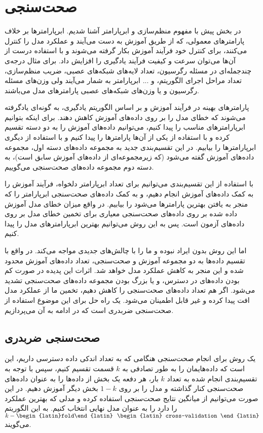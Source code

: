 \section{صحت‌سنجی}

در بخش پیش با مفهوم منظم‌سازی و ابرپارامتر آشنا شدیم. ابرپارامتر‌ها بر خلاف پارامترهای معمولی، که از طریق آموزش به دست می‌آیند و عملکرد مدل را کنترل می‌کنند، برای کنترل خود فرآیند آموزش بکار گرفته می‌شوند و با استفاده درست از آن‌ها می‌توان سرعت و کیفیت فرآیند یادگیری را افزایش داد. 
برای مثال درجه‌ی چندجمله‌ای در مسئله‌ رگرسیون، تعداد لایه‌های شبکه‌های عصبی، ضریب منظم‌سازی، تعداد مراحل اجرای الگوریتم، و ... ابرپارامتر به شمار می‌آیند ولی وزن‌های مسئله رگرسیون و یا وزن‌های شبکه‌های عصبی پارامتر‌های مدل می‌باشند.

پارامتر‌های بهینه در فرآیند آموزش و بر اساس الگوریتم یادگیری، به گونه‌ای یادگرفته می‌شوند که خطای مدل را بر روی داده‌های آموزش کاهش دهند. برای اینکه بتوانیم ابرپارامتر‌های مناسب را پیدا کنیم، می‌توانیم داده‌های آموزش را به دو دسته تقسیم کرده و با استفاده از یکی از آن‌ها پارامتر‌ها را پیدا کنیم و با استفاده از دیگری ابرپارامتر‌ها را بیابیم. در این تقسیم‌بندی جدید به مجموعه‌ داده‌های دسته اول، مجموعه‌ داده‌های آموزش گفته می‌شود (که زیرمجموعه‌ای از داده‌های آموزش سابق است)، به دسته دوم مجموعه داده‌های صحت‌سنجی می‌گوییم.

با استفاده از این تقسیم‌بندی می‌توانیم برای تعداد ابرپارامتر دلخواه، فرآیند آموزش را به کمک داده‌های آموزش انجام دهیم، و به کمک داده‌های صحت‌سنجی ابرپارامتر را که منجر به یافتن بهترین پارامتر‌ها می‌شود را بیابیم. در واقع میزان خطای مدل آموزش داده شده بر روی داده‌های صحت‌سنجی معیاری برای تخمین خطای مدل بر روی داده‌های آزمون است. پس به این روش می‌توانیم بهترین ابرپارامترهای مدل را پیدا کنیم.

اما این روش بدون ایراد نبوده و ما را با چالش‌های جدیدی مواجه می‌کند. در واقع با تقسیم داده‌ها به دو مجموعه آموزش و صحت‌سنجی، تعداد داده‌های آموزش محدود شده و این منجر به کاهش عملکرد مدل خواهد شد. اثرات این پدیده در صورت کم بودن داده‌های در دسترس، و یا بزرگ بودن مجموعه‌ داده‌های صحت‌سنجی تشدید می‌شود. اگر هم تعداد داده‌های صحت‌سنجی را کاهش دهیم، تخمین ما از عملکرد مدل افت پیدا کرده و غیر قابل اطمینان می‌شود. یک راه حل برای این موضوع استفاده از صحت‌سنجی ضربدری است که در ادامه به آن می‌پردازیم.

\subsection{صحت‌سنجی ضربدری}

یک روش برای انجام صحت‌سنجی هنگامی که به تعداد اندکی داده دسترسی داریم، این است که داده‌هایمان را به طور تصادفی به  $k$ قسمت تقسیم کنیم، سپس با توجه به تقسیم‌بندی انجام شده به تعداد $k$ بار، هر دفعه یک بخش از داده‌ها را به عنوان داده‌های صحت‌سنجی کنار گذاشته و مدل را بر روی $1-k$ بخش دیگر آموزش دهیم. در این صورت می‌توانیم از میانگین نتایج صحت‌سنجی استفاده کرده و مدلی که بهترین عملکرد را دارد را به عنوان مدل نهایی انتخاب کنیم. به این الگوریتم $k-\text{\begin{latin}fold\end{latin} } ~\text{\begin{latin}
        cross-validation
    \end{latin}}$ می‌گویند.


